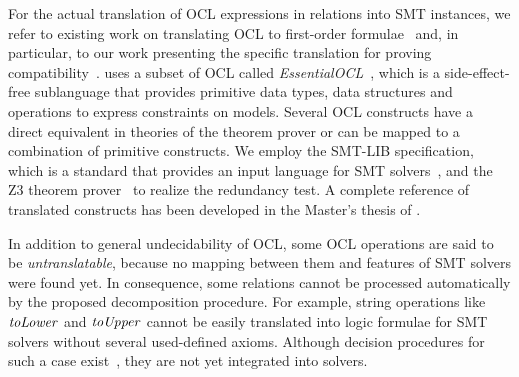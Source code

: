 
For the actual translation of \gls{OCL} expressions in \qvtr relations into \gls{SMT} instances, we refer to existing work on translating \gls{OCL} to first-order formulae~\cite{beckert2002ocltranslation} and, in particular, to our work presenting the specific translation for proving compatibility~.
\qvtr uses a subset of \gls{OCL} called \emph{EssentialOCL}~\cite{qvt}, which is a side-effect-free sublanguage that provides primitive data types, data structures and operations to express constraints on models.
Several \gls{OCL} constructs have a direct equivalent in theories of the theorem prover or can be mapped to a combination of primitive constructs.
We employ the SMT-LIB specification, which is a standard that provides an input language for \gls{SMT} solvers~\cite{smtlib2017}, and the Z3 theorem prover~\cite{z32008} to realize the redundancy test.
A complete reference of translated constructs has been developed in the Master's thesis of \textcite{pepin2019ma}.

In addition to general undecidability of \gls{OCL}, some \gls{OCL} operations are said to be \emph{untranslatable}, because no mapping between them and features of \gls{SMT} solvers were found yet.
In consequence, some \qvtr relations cannot be processed automatically by the proposed decomposition procedure.
For example, string operations like $\mathit{toLower}$ and $\mathit{toUpper}$ cannot be easily translated into logic formulae for \gls{SMT} solvers without several used-defined axioms.
Although decision procedures for such a case exist~\cite{veanes2012transducers}, they are not yet integrated into solvers.

